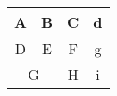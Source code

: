 \documentclass[a4paper]{article}
\begin{document}
\begin{center}
    \begin{tabular}[c]{|c|c|c|c|} 
    \hline
    A & B & C & d \\
    \hline
    D & E & F & g \\
    \hline
    \multicolumn{2}{|c|}{G} & H & i \\
    \hline
    \end{tabular}
\end{center}
\end{document}
